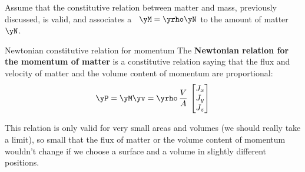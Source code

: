 Assume that the constitutive relation between matter and mass, previously discussed, is valid, and associates a \masse\ $\yM=\yrho\yN$ to the amount of matter $\yN$.

%
\begin{definition}{Newtonian constitutive relation for momentum}
The \textbf{Newtonian relation for the momentum of matter} is a constitutive relation saying that the flux and velocity of matter and the volume content of momentum are proportional:
  \begin{equation}
    \label{neq:matter_momentum_Newton}
    \yP = \yM\yv = \yrho\, \frac{V}{A}\,
  \begin{bmatrix}
    J_{x}\\J_{y}\\J_{z}
  \end{bmatrix}
  \end{equation}
\end{definition}
This relation is only valid for very small areas and volumes (we should really take a limit), so small that the flux of matter or the volume content of momentum wouldn't change if we choose a surface and a volume in slightly different positions.


